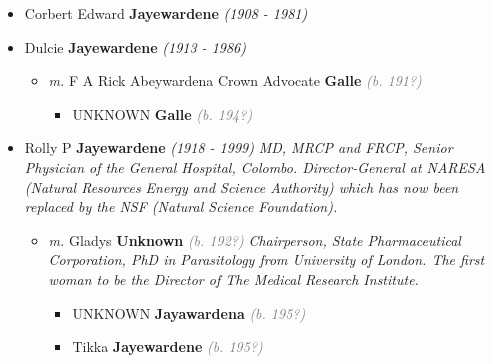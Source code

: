 \documentclass[10pt, openany]{book}
\begin{document}
\begin{itemize}
{\begin{itemize}
{\begin{itemize}
{\begin{itemize}
\item{Anil Weeratunga \textbf{Corea} \textcolor{gray}{\textit{(b. 194?)}}
  }
\end{itemize}}
\end{itemize}
 }
\item{Corbert Edward \textbf{Jayewardene} \textcolor{slorange}{\textit{(1908 - 1981)}}
  }
\item{Dulcie \textbf{Jayewardene} \textcolor{slorange}{\textit{(1913 - 1986)}}
\begin{itemize}
\item{\textit{m.} F A Rick Abeywardena Crown Advocate \textbf{Galle} \textcolor{gray}{\textit{(b. 191?)}}   \label{couple:00002591:00003466} \begin{itemize}
\item{UNKNOWN \textbf{Galle} \textcolor{gray}{\textit{(b. 194?)}}
 }
\end{itemize}}
\end{itemize}
 }
\item{Rolly P \textbf{Jayewardene} \textcolor{slorange}{\textit{(1918 - 1999)}} \textcolor{slmaroon}{\textit{MD, MRCP and FRCP, Senior Physician of the General Hospital, Colombo. Director-General at NARESA (Natural Resources Energy and Science Authority) which has now been replaced by the NSF (Natural Science Foundation).}}
\begin{itemize}
\item{\textit{m.} Gladys \textbf{Unknown} \textcolor{gray}{\textit{(b. 192?)}} \textcolor{slmaroon}{\textit{Chairperson, State Pharmaceutical Corporation, PhD in Parasitology from University of London. The first woman to be the Director of The Medical Research Institute.}}   \label{couple:00002593:00002599} \begin{itemize}
\item{UNKNOWN \textbf{Jayawardena} \textcolor{gray}{\textit{(b. 195?)}}
 }
\item{Tikka \textbf{Jayewardene} \textcolor{gray}{\textit{(b. 195?)}}
\begin{itemize}

\end{itemize}}
\end{itemize}}
\end{itemize}}
\end{itemize}}
\end{itemize}
\end{document}
